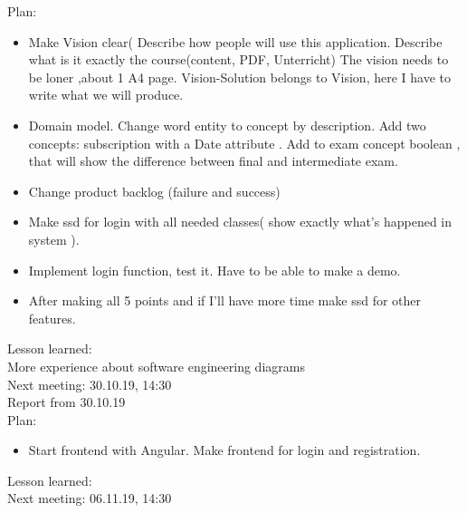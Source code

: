 \documentclass{scrartcl}
\begin{document}
Plan:
\begin{itemize}


 
	\item	Make Vision clear( Describe how people will use this application. Describe what is it exactly the course(content, PDF, Unterricht) The vision needs to be loner ,about 1 A4 page.
Vision-Solution belongs to Vision, here I have to write what we will produce.
	\item	Domain model. Change word entity to concept by description.
Add two concepts: subscription with a Date attribute .
Add to exam concept boolean , that will show the difference between final and intermediate exam.
	\item	Change product backlog (failure and success) 
	\item	Make ssd for login with all needed classes( show exactly what’s happened in system ). 
	\item	Implement login function, test it. Have to be able to make a demo.
	\item	After making all 5 points and if I’ll have more time make ssd for other features.
	\end{itemize}
Lesson learned: \\
More experience about software engineering diagrams\\
Next meeting: 30.10.19, 14:30\\


Report from 30.10.19\\
Plan:\\
\begin{itemize}


	\item	Start frontend with Angular. Make frontend for login and registration.
	\end{itemize}
Lesson learned:\\

Next meeting: 06.11.19, 14:30\\
\end{document}
